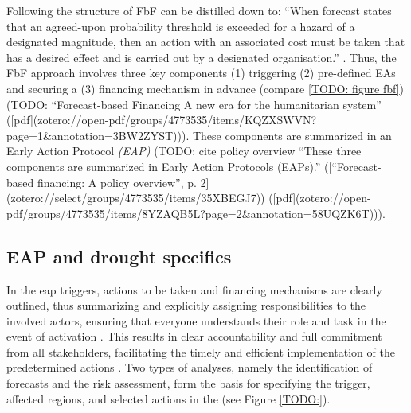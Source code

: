 
Following \autocite{coughlandeperezForecastbasedFinancingApproach2015, coughlandeperezActionbasedFloodForecasting2016} the structure of FbF can be distilled down to:
    “When forecast states that an agreed-upon probability threshold is exceeded for a hazard of a designated magnitude, then an action with an associated cost must be taken that has a desired effect and is carried out by a designated organisation.” \autocite[2]{coughlandeperezActionbasedFloodForecasting2016}.
Thus, the FbF approach involves three key components (1) triggering (2) pre-defined EAs and securing a (3) financing mechanism in advance (compare \ref{TODO: figure fbf}) (TODO: “Forecast-based Financing A new era for the humanitarian system” ([pdf](zotero://open-pdf/groups/4773535/items/KQZXSWVN?page=1&annotation=3BW2ZYST))). These components are summarized in an Early Action Protocol \textit{(EAP)} (TODO: cite policy overview “These three components are summarized in Early Action Protocols (EAPs).” ([“Forecast-based financing: A policy overview”, p. 2](zotero://select/groups/4773535/items/35XBEGJ7)) ([pdf](zotero://open-pdf/groups/4773535/items/8YZAQB5L?page=2&annotation=58UQZK6T))). 



\subsection{EAP and drought specifics}

In the \acrfull*{eap} triggers, actions to be taken and financing mechanisms are clearly outlined, thus summarizing and explicitly assigning responsibilities to the involved actors, ensuring that everyone understands their role and task in the event of activation \autocite{ruthForecastbasedFinancingPolicy2017}. This results in clear accountability and full commitment from all stakeholders, facilitating the timely and efficient implementation of the predetermined actions \autocite{ruthForecastbasedFinancingPolicy2017}.
Two types of analyses, namely the identification of forecasts and the risk assessment, form the basis for specifying the trigger, affected regions, and selected actions in the  (see Figure \ref*{TODO:}). 

